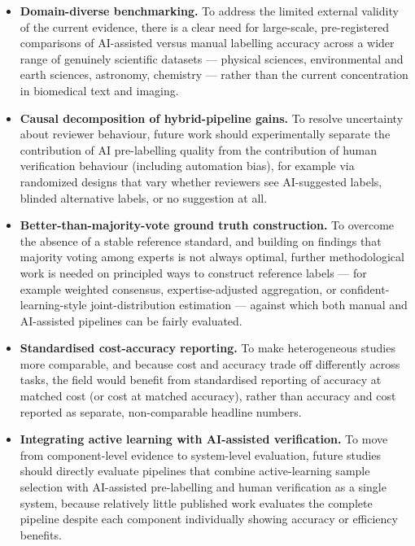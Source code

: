 \documentclass[acmsmall,nonacm]{acmart}
\begin{document}
\begin{itemize}
    \item \textbf{Domain-diverse benchmarking.} To address the limited external validity of the current evidence, there is a clear need for large-scale, pre-registered comparisons of AI-assisted versus manual labelling accuracy across a wider range of genuinely scientific datasets --- physical sciences, environmental and earth sciences, astronomy, chemistry --- rather than the current concentration in biomedical text and imaging.

    \item \textbf{Causal decomposition of hybrid-pipeline gains.} To resolve uncertainty about reviewer behaviour, future work should experimentally separate the contribution of AI pre-labelling quality from the contribution of human verification behaviour (including automation bias), for example via randomized designs that vary whether reviewers see AI-suggested labels, blinded alternative labels, or no suggestion at all.

    \item \textbf{Better-than-majority-vote ground truth construction.} To overcome the absence of a stable reference standard, and building on findings that majority voting among experts is not always optimal, further methodological work is needed on principled ways to construct reference labels --- for example weighted consensus, expertise-adjusted aggregation, or confident-learning-style joint-distribution estimation --- against which both manual and AI-assisted pipelines can be fairly evaluated.

    \item \textbf{Standardised cost-accuracy reporting.} To make heterogeneous studies more comparable, and because cost and accuracy trade off differently across tasks, the field would benefit from standardised reporting of accuracy at matched cost (or cost at matched accuracy), rather than accuracy and cost reported as separate, non-comparable headline numbers.

    \item \textbf{Integrating active learning with AI-assisted verification.} To move from component-level evidence to system-level evaluation, future studies should directly evaluate pipelines that combine active-learning sample selection with AI-assisted pre-labelling and human verification as a single system, because relatively little published work evaluates the complete pipeline despite each component individually showing accuracy or efficiency benefits.


\end{itemize}
\end{document}
